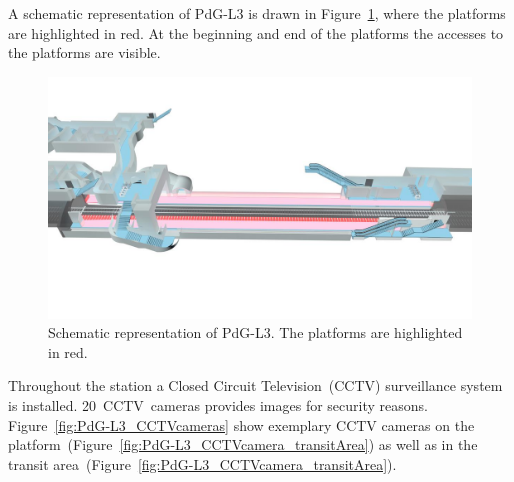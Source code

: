 A schematic representation of PdG-L3 is drawn in Figure~\ref{fig:PdG-L3_schematic}, where the platforms are highlighted in red. At the beginning and end of the platforms the accesses to the platforms are visible.

\begin{figure}[htbp]
  \centering
  \includegraphics[width=\linewidth]{Figures/PdG-L3_schematic2.jpg} 
  \caption{Schematic representation of PdG-L3. The platforms are highlighted in red. \cite{TMB}}
  \label{fig:PdG-L3_schematic}
\end{figure}

Throughout the station a Closed Circuit Television~(CCTV) surveillance system is installed. 20~CCTV~cameras provides images for security reasons. Figure~\ref{fig:PdG-L3_CCTVcameras} show exemplary CCTV cameras on the platform~(Figure~\ref{fig:PdG-L3_CCTVcamera_transitArea}) as well as in the transit area~(Figure~\ref{fig:PdG-L3_CCTVcamera_transitArea}).

